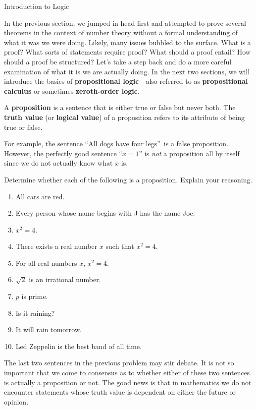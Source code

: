 \begin{section}{Introduction to Logic}\label{sec:Intro_to_Logic}

In the previous section, we jumped in head first and attempted to prove several theorems in the context of number theory without a formal understanding of what it was we were doing. Likely, many issues bubbled to the surface. What is a proof? What sorts of statements require proof? What should a proof entail?  How should a proof be structured? Let's take a step back and do a more careful examination of what it is we are actually doing. In the next two sections, we will introduce the basics of \textbf{propositional logic}---also referred to as \textbf{propositional calculus} or sometimes \textbf{zeroth-order logic}.

\begin{definition}\label{def:proposition}
A \textbf{proposition} is a sentence that is either true or false but never both. The \textbf{truth value} (or \textbf{logical value}) of a proposition refers to its attribute of being true or false.
\end{definition}

For example, the sentence ``All dogs have four legs''~is a false proposition.  However, the perfectly good sentence ``$x=1$'' is \emph{not} a proposition all by itself since we do not actually know what $x$ is.

\begin{problem} Determine whether each of the following is a proposition. Explain your reasoning.
\begin{enumerate}[label=\textrm{(\alph*)}]
\item All cars are red.
\item Every person whose name begins with J has the name Joe.
\item $x^2=4$.
\item There exists a real number $x$ such that $x^2=4$.
\item For all real numbers $x$, $x^2=4$.
\item $\sqrt{2}$ is an irrational number.
\item $p$ is prime.
\item Is it raining?
\item It will rain tomorrow.
\item Led Zeppelin is the best band of all time.
\end{enumerate}
\end{problem}

The last two sentences in the previous problem may stir debate. It is not so important that we come to consensus as to whether either of these two sentences is actually a proposition or not. The good news is that in mathematics we do not encounter statements whose truth value is dependent on either the future or opinion.


\end{section}
